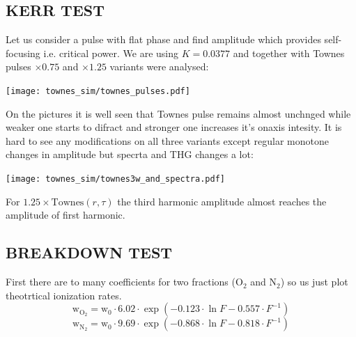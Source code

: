 \documentclass{article}
\begin{document}
\subsection{KERR TEST}
Let us consider a pulse with flat phase and find amplitude which provides self-focusing i.e. critical power. 
We are using $K=0.0377$ and together with Townes pulses $\times 0.75$ and $\times 1.25$ variants were analysed:
\begin{center}
\texttt{[image: townes\_sim/townes\_pulses.pdf]}
\label{figTownesSim}
\end{center}
On the pictures it is well seen that Townes pulse remains almost unchnged while weaker one starts to difract and stronger one increases it's onaxis intesity.
It is hard to see any modifications on all three variants except regular monotone changes in amplitude but specrta and THG changes a lot:

\begin{center}
\texttt{[image: townes\_sim/townes3w\_and\_spectra.pdf]}
\label{figTownesSim_3W_Spec}
\end{center}

\noindent
For $1.25 \times \mathrm{Townes}(r,\tau)$ the third harmonic amplitude almost reaches the amplitude of first harmonic.

\newpage
\subsection{BREAKDOWN TEST}
First there are to many coefficients for two fractions ($\mathrm{O}_2$ and $\mathrm{N}_2$) so us just plot theotrtical ionization rates.
\[ \mathrm{w}_{\mathrm{O}_2} = \mathrm{w}_0 \cdot 6.02 \cdot \exp( - 0.123 \cdot \ln F - 0.557 \cdot F^{-1}) \]
\[ \mathrm{w}_{\mathrm{N}_2} = \mathrm{w}_0 \cdot 9.69 \cdot \exp( - 0.868 \cdot \ln F - 0.818 \cdot F^{-1}) \]
\end{document}
